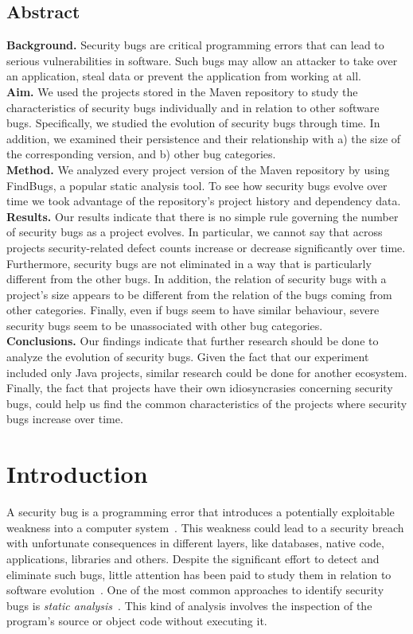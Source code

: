 \documentclass[letterpaper,twocolumn,10pt]{article}
\begin{document}
\subsection*{Abstract}
{\bf Background.} Security bugs are critical programming errors that can lead to serious
vulnerabilities in software. Such bugs may allow an attacker to take over
an application, steal data or prevent the application from working at all.\\
{\bf Aim.} We used the projects stored in the Maven repository to study the
characteristics of security bugs individually and in relation to other software
bugs. Specifically, we studied
the evolution of security bugs through time. In addition, we examined
their persistence and their relationship with
a) the size of the corresponding version, and
b) other bug categories.\\
{\bf Method.} We analyzed every project version of the Maven repository by
using FindBugs, a popular static analysis tool.
To see how security bugs evolve over time we took advantage of
the repository's project history and dependency data.\\
{\bf Results.} Our results indicate that there is no simple rule governing
the number of security bugs as a project evolves.
In particular, we cannot say that across projects security-related
defect counts increase or decrease significantly over time.
Furthermore, security bugs are not eliminated in a
way that is particularly different from the other bugs.
In addition, the relation of security bugs with a project's size
appears to be different from the relation of the bugs
coming from other categories.
Finally, even if bugs seem to have similar behaviour,
severe security bugs seem to be unassociated with other bug categories.\\
{\bf Conclusions.} Our findings indicate that further research should be done
to analyze the evolution of security bugs. Given the fact that our experiment
included only Java projects, similar research could be done for another
ecosystem. Finally, the fact that projects have their own idiosyncrasies
concerning security bugs, could help us find the common characteristics
of the projects where security bugs increase over time.

\section{Introduction}

A security bug is a programming error that introduces a potentially exploitable
weakness into a computer system~\cite{SSL12}. This
weakness could lead to a security breach with unfortunate consequences in
different layers, like databases, native code, applications, libraries and
others. Despite the significant effort to detect and eliminate such
bugs, little attention has been paid to study them in relation to
software evolution~\cite{LRWPT97}. 
One of the most common approaches to identify security bugs is
{\it static analysis}~\cite{CW07}. This kind of analysis involves the
inspection of the program's source or object code without executing
it. 
\end{document}
